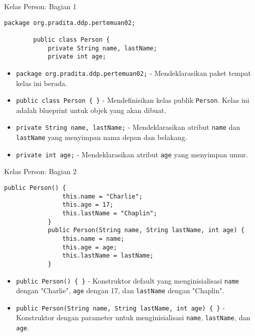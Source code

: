 \documentclass[aspectratio=169, table]{beamer}
\begin{document}


\begin{frame}[fragile]{Kelas Person: Bagian 1}
	\begin{lstlisting}[style=JavaStyle]
		package org.pradita.ddp.pertemuan02;

		public class Person {		
			private String name, lastName;
			private int age;
		\end{lstlisting}
		
		\begin{itemize}
			\item \texttt{package org.pradita.ddp.pertemuan02;} - Mendeklarasikan paket tempat kelas ini berada.
			\item \texttt{public class Person \{ \}} - Mendefinisikan kelas publik \texttt{Person}. Kelas ini adalah blueprint untuk objek yang akan dibuat.
			\item \texttt{private String name, lastName;} - Mendeklarasikan atribut \texttt{name} dan \texttt{lastName} yang menyimpan nama depan dan belakang.
			\item \texttt{private int age;} - Mendeklarasikan atribut \texttt{age} yang menyimpan umur.
		\end{itemize}
	\end{frame}
	
	\begin{frame}[fragile]{Kelas Person: Bagian 2}
		\begin{lstlisting}[style=JavaStyle]
			public Person() {
				this.name = "Charlie";
				this.age = 17;
				this.lastName = "Chaplin";
			}	
			public Person(String name, String lastName, int age) {
				this.name = name;
				this.age = age;
				this.lastName = lastName;
			}
		\end{lstlisting}
		
		\begin{itemize}
			\item \texttt{public Person() \{ \}} - Konstruktor default yang menginisialisasi \texttt{name} dengan "Charlie", \texttt{age} dengan 17, dan \texttt{lastName} dengan "Chaplin".
			\item \texttt{public Person(String name, String lastName, int age) \{ \}} - Konstruktor dengan parameter untuk menginisialisasi \texttt{name}, \texttt{lastName}, dan \texttt{age}.
		\end{itemize}
	\end{frame}
	
\end{document}
